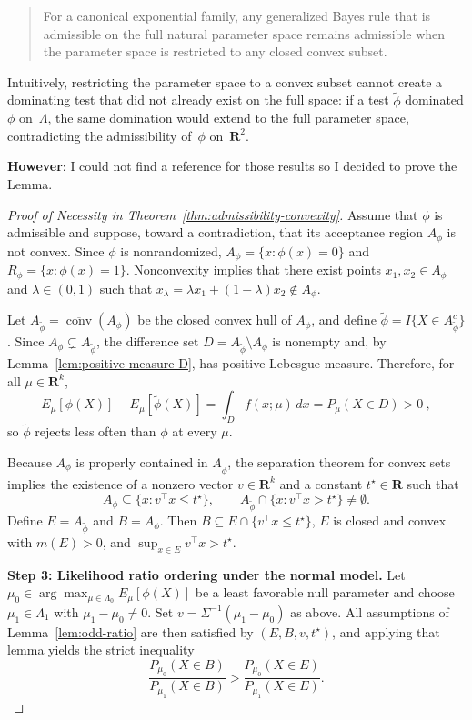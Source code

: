 \documentclass[12pt]{article}
\theoremstyle{definition}
\theoremstyle{remark}
\begin{document}
\begin{quote}
For a canonical exponential family, any generalized Bayes rule that is admissible on the full natural parameter space remains admissible when the parameter space is restricted to any closed convex subset.
\end{quote}

Intuitively, restricting the parameter space to a convex subset cannot create a dominating test that did not already exist on the full space: if a test $\tilde{\phi}$ dominated $\phi$ on~$\Lambda$, the same domination would extend to the full parameter space, contradicting the admissibility of~$\phi$ on~$\mathbf{R}^2$.

\textbf{However}: I could not find a reference for those results so I decided to prove the Lemma. 


\newpage 
\begin{proof}[Proof of Necessity in Theorem~\ref{thm:admissibility-convexity}]
Assume that $\phi$ is admissible and suppose, toward a contradiction, that its acceptance region $A_\phi$ is not convex. Since $\phi$ is nonrandomized, $A_\phi = \{x : \phi(x)=0\}$ and $R_\phi = \{x : \phi(x)=1\}$. Nonconvexity implies that there exist points $x_1,x_2 \in A_\phi$ and $\lambda\in(0,1)$ such that
$x_\lambda = \lambda x_1 + (1-\lambda)x_2 \notin A_\phi$.

Let $A_{\tilde{\phi}} = \overline{\operatorname{conv}}(A_\phi)$ be the closed convex hull of $A_\phi$,
and define $\tilde{\phi} = I\{X\in A_{\tilde{\phi}}^c\}$. Since $A_\phi \subsetneq A_{\tilde{\phi}}$, the difference set $D = A_{\tilde{\phi}}\setminus A_\phi$ is nonempty and, 
by Lemma~\ref{lem:positive-measure-D}, has positive Lebesgue measure.
Therefore, for all $\mu \in \mathbf{R}^k$,
\[
E_\mu[\phi(X)] - E_\mu[\tilde{\phi}(X)]
= \int_D f(x;\mu)\,dx
= P_\mu(X\in D) > 0~,
\]
so $\tilde{\phi}$ rejects less often than $\phi$ at every $\mu$. 

Because $A_\phi$ is properly contained in $A_{\tilde{\phi}}$, the separation theorem for convex sets 
implies the existence of a nonzero vector $v \in \mathbf{R}^k$ and a constant $t^\star\in\mathbf{R}$ such that
\[
A_\phi \subseteq \{x: v^\top x \le t^\star\},
\qquad
A_{\tilde{\phi}} \cap \{x: v^\top x > t^\star\} \neq \emptyset.
\]
Define $E = A_{\tilde{\phi}}$ and $B = A_\phi$.
Then $B \subseteq E\cap\{v^\top x \le t^\star\}$,
$E$ is closed and convex with $m(E)>0$, and $\sup_{x\in E}v^\top x > t^\star$.

\medskip
\noindent
\textbf{Step 3: Likelihood ratio ordering under the normal model.}
Let $\mu_0 \in \arg\max_{\mu\in\Lambda_0}E_\mu[\phi(X)]$ be a least favorable null parameter
and choose $\mu_1 \in \Lambda_1$ with $\mu_1-\mu_0 \ne 0$.
Set $v=\Sigma^{-1}(\mu_1-\mu_0)$ as above.
All assumptions of Lemma~\ref{lem:odd-ratio} are then satisfied by $(E,B,v,t^\star)$,
and applying that lemma yields the strict inequality
\begin{equation}\label{eq:ratio-key}
\frac{P_{\mu_0}(X\in B)}{P_{\mu_1}(X\in B)}
>
\frac{P_{\mu_0}(X\in E)}{P_{\mu_1}(X\in E)}.
\end{equation}


\end{proof}
\end{document}
